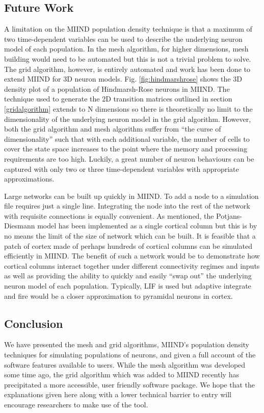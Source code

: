 \documentclass[utf8]{frontiersSCNS} %
\begin{document}
\subsection*{Future Work}
A limitation on the MIIND population density technique is that a maximum of two time-dependent variables can be used to describe the underlying neuron model of each population. In the mesh algorithm, for higher dimensions, mesh building would need to be automated but this is not a trivial problem to solve. The grid algorithm, however, is entirely automated and work has been done to extend MIIND for 3D neuron models. Fig. \ref{fig:hindmarshrose} shows the 3D density plot of a population of Hindmarsh-Rose neurons in MIIND. The technique used to generate the 2D transition matrices outlined in section \ref{gridalgorithm} extends to N dimensions so there is theoretically no limit to the dimensionality of the underlying neuron model in the grid algorithm. However, both the grid algorithm and mesh algorithm suffer from ``the curse of dimensionality'' such that with each additional variable, the number of cells to cover the state space increases to the point where the memory and processing requirements are too high. Luckily, a great number of neuron behaviours can be captured with only two or three time-dependent variables with appropriate approximations.

 Large networks can be built up quickly in MIIND. To add a node to a simulation file requires just a single line. Integrating the node into the rest of the network with requisite connections is equally convenient. As mentioned, the Potjans-Diesmann model has been implemented as a single cortical column but this is by no means the limit of the size of network which can be built. It is feasible that a patch of cortex made of perhaps hundreds of cortical columns can be simulated efficiently in MIIND. The benefit of such a network would be to demonstrate how cortical columns interact together under different connectivity regimes and inputs as well as providing the ability to quickly and easily ``swap out'' the underlying neuron model of each population. Typically, LIF is used but adaptive integrate and fire would be a closer approximation to pyramidal neurons in cortex.
 
 \subsection*{Conclusion}
 We have presented the mesh and grid algorithms, MIIND's population density techniques for simulating populations of neurons, and given a full account of the software features available to users. While the mesh algorithm was developed some time ago, the grid algorithm which was added to MIIND recently has precipitated a more accessible, user friendly software package. We hope that the explanations given here along with a lower technical barrier to entry will encourage researchers to make use of the tool. 
\end{document}
